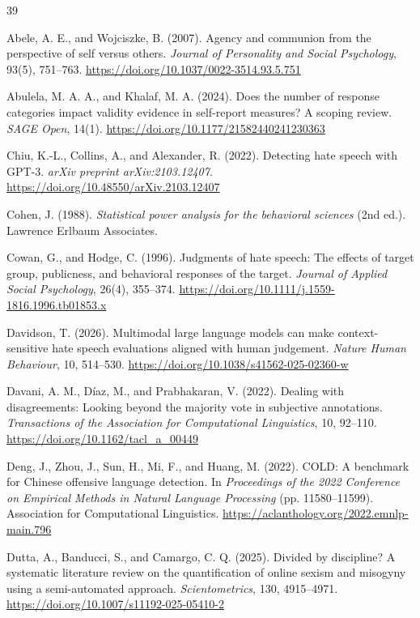 \documentclass[a4paper,fleqn,review,longmktitle]{cas-sc}
\begin{document}
\begin{thebibliography}{39}

Abele, A. E., and Wojciszke, B. (2007).
Agency and communion from the perspective of self versus others.
\emph{Journal of Personality and Social Psychology}, 93(5), 751--763.
\url{https://doi.org/10.1037/0022-3514.93.5.751}

Abulela, M. A. A., and Khalaf, M. A. (2024).
Does the number of response categories impact validity evidence in self-report measures? A scoping review.
\emph{SAGE Open}, 14(1).
\url{https://doi.org/10.1177/21582440241230363}

Chiu, K.-L., Collins, A., and Alexander, R. (2022).
Detecting hate speech with GPT-3.
\emph{arXiv preprint arXiv:2103.12407}.
\url{https://doi.org/10.48550/arXiv.2103.12407}

Cohen, J. (1988).
\emph{Statistical power analysis for the behavioral sciences} (2nd ed.).
Lawrence Erlbaum Associates.

Cowan, G., and Hodge, C. (1996).
Judgments of hate speech: The effects of target group, publicness, and behavioral responses of the target.
\emph{Journal of Applied Social Psychology}, 26(4), 355--374.
\url{https://doi.org/10.1111/j.1559-1816.1996.tb01853.x}

Davidson, T. (2026).
Multimodal large language models can make context-sensitive hate speech evaluations aligned with human judgement.
\emph{Nature Human Behaviour}, 10, 514--530.
\url{https://doi.org/10.1038/s41562-025-02360-w}

Davani, A. M., D\'iaz, M., and Prabhakaran, V. (2022).
Dealing with disagreements: Looking beyond the majority vote in subjective annotations.
\emph{Transactions of the Association for Computational Linguistics}, 10, 92--110.
\url{https://doi.org/10.1162/tacl_a_00449}

Deng, J., Zhou, J., Sun, H., Mi, F., and Huang, M. (2022).
COLD: A benchmark for Chinese offensive language detection.
In \emph{Proceedings of the 2022 Conference on Empirical Methods in Natural Language Processing} (pp. 11580--11599).
Association for Computational Linguistics.
\url{https://aclanthology.org/2022.emnlp-main.796}

Dutta, A., Banducci, S., and Camargo, C. Q. (2025).
Divided by discipline? A systematic literature review on the quantification of online sexism and misogyny using a semi-automated approach.
\emph{Scientometrics}, 130, 4915--4971.
\url{https://doi.org/10.1007/s11192-025-05410-2}


\end{thebibliography}
\end{document}
